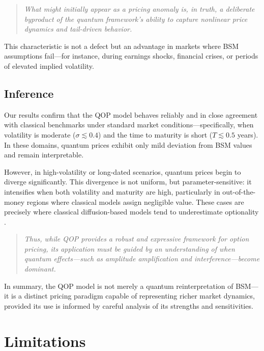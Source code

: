 \documentclass[11pt]{article}
\begin{document}
\begin{quote}
\textit{What might initially appear as a pricing anomaly is, in truth, a deliberate byproduct of the quantum framework’s ability to capture nonlinear price dynamics and tail-driven behavior.}
\end{quote}

This characteristic is not a defect but an advantage in markets where BSM assumptions fail—for instance, during earnings shocks, financial crises, or periods of elevated implied volatility.

\vspace{0.3cm}

\subsection{Inference}

Our results confirm that the QOP model behaves reliably and in close agreement with classical benchmarks under standard market conditions—specifically, when volatility is moderate ($\sigma \lesssim 0.4$) and the time to maturity is short ($T \lesssim 0.5$ years). In these domains, quantum prices exhibit only mild deviation from BSM values and remain interpretable.

However, in high-volatility or long-dated scenarios, quantum prices begin to diverge significantly. This divergence is not uniform, but parameter-sensitive: it intensifies when both volatility and maturity are high, particularly in out-of-the-money regions where classical models assign negligible value. These cases are precisely where classical diffusion-based models tend to underestimate optionality \cite{baaquie2007quantum}.

\begin{quote}
\textit{Thus, while QOP provides a robust and expressive framework for option pricing, its application must be guided by an understanding of when quantum effects—such as amplitude amplification and interference—become dominant.}
\end{quote}

In summary, the QOP model is not merely a quantum reinterpretation of BSM—it is a distinct pricing paradigm capable of representing richer market dynamics, provided its use is informed by careful analysis of its strengths and sensitivities.


\section{Limitations}
\end{document}
